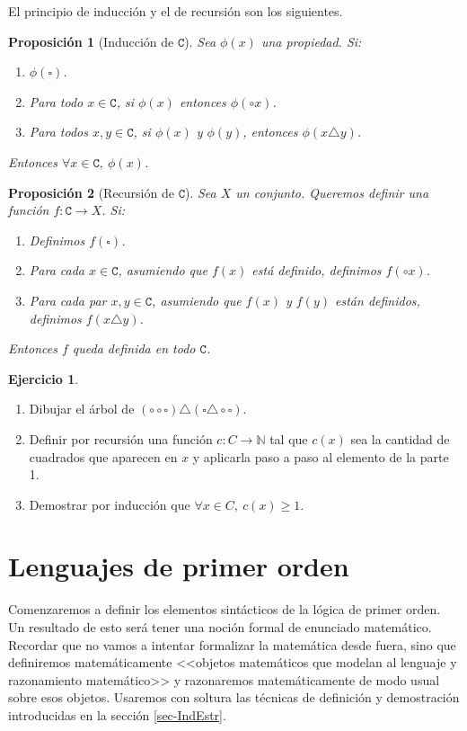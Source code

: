\documentclass[a4paper, 12pt]{report}
\newcommand{\N}{\mathbb{N}}
\newtheorem*{prop*}{Proposición}
\theoremstyle{definition}
\newtheorem{ejercicio}{Ejercicio}[section]
\begin{document}
El principio de inducción y el de recursión son los siguientes.
\begin{prop*}[Inducción de $\mathtt{C}$]
	
	Sea $\phi(x)$ una propiedad. Si:
	\begin{enumerate}
		\item $\phi(\square)$.
		\item Para todo $x\in\mathtt{C}$, si $\phi(x)$ entonces $\phi(\circ x)$.
		\item Para todos $x,y\in\mathtt{C}$, si $\phi(x)$ y $\phi(y)$, entonces $\phi(x\triangle y)$.	\end{enumerate}
	Entonces $\forall x\in\mathtt{C},~\phi(x)$.
\end{prop*}
\begin{prop*}[Recursión de $\mathtt{C}$]
	Sea $X$ un conjunto. Queremos definir una función \linebreak$f:\mathtt{C}\to X$. Si:
	\begin{enumerate}
		\item Definimos $f(\square)$.
		\item Para cada $x\in\mathtt{C}$, asumiendo que $f(x)$ está definido, definimos $f(\circ x)$.
		\item Para cada par $x,y\in\mathtt{C}$, asumiendo que $f(x)$ y $f(y)$ están definidos, definimos $f(x\triangle y)$.
	\end{enumerate}
	Entonces $f$ queda definida en todo $\mathtt{C}$.
\end{prop*}

\begin{ejercicio}
	\begin{enumerate}
		\item Dibujar el árbol de $(\circ\circ\square)\triangle(\square\triangle\circ\square)$.
		\item Definir por recursión una función $c:C\to\N$ tal que $c(x)$ sea la cantidad de cuadrados que aparecen en $x$ y aplicarla paso a paso al elemento de la parte 1.
		\item Demostrar por inducción que $\forall x\in C,~c(x)\geq 1$.
	\end{enumerate}
\end{ejercicio}

\section{Lenguajes de primer orden}

Comenzaremos a definir los elementos sintácticos de la lógica de primer orden. Un resultado de esto será tener una noción formal de enunciado matemático. Recordar que no vamos a intentar formalizar la matemática desde fuera, sino que definiremos matemáticamente <<objetos matemáticos que modelan al lenguaje y razonamiento matemático>> y razonaremos matemáticamente de modo usual sobre esos objetos. Usaremos con soltura las técnicas de definición y demostración introducidas en la sección \ref{sec-IndEstr}.
\end{document}
